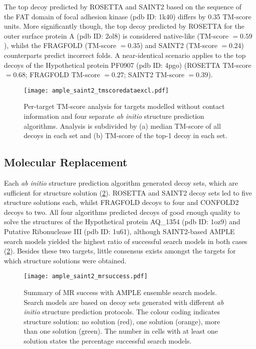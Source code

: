 The top decoy predicted by ROSETTA and SAINT2 based on the sequence of the FAT domain of focal adhesion kinase (\gls{pdb} ID: 1k40) differs by 0.35 TM-score units. More significantly though, the top decoy predicted by ROSETTA for the outer surface protein A (\gls{pdb} ID: 2ol8) is considered native-like (TM-score $=0.59$), whilst the FRAGFOLD (TM-score $=0.35$) and SAINT2 (TM-score $=0.24$) counterparts predict incorrect folds. A near-identical scenario applies to the top decoys of the Hypothetical protein PF0907 (\gls{pdb} ID: 4pgo) (ROSETTA TM-score $=0.68$; FRAGFOLD TM-score $=0.27$; SAINT2 TM-score $=0.39$).

\begin{figure}[H]
    \centering
    \texttt{[image: ample\_saint2\_tmscoredataexcl.pdf]}
    \caption[Per-target TM-score analysis for four modelling algorithms without contacts]{Per-target TM-score analysis for targets modelled without contact information and four separate \textit{ab initio} structure prediction algorithms. Analysis is subdivided by (a) median TM-score of all decoys in each set and (b) TM-score of the top-1 decoy in each set.}
    \label{fig:ample_saint2_tmscoredataexcl}
\end{figure}

\subsection{Molecular Replacement}

Each \textit{ab initio} structure prediction algorithm generated decoy sets, which are sufficient for structure solution (\cref{fig:ample_saint2_mrsuccess}). ROSETTA and SAINT2 decoy sets led to five structure solutions each, whilst FRAGFOLD decoys to four and CONFOLD2 decoys to two. All four algorithms predicted decoys of good enough quality to solve the structures of the Hypothetical protein AQ\_1354 (\gls{pdb} ID: 1oz9) and Putative Ribonuclease III (\gls{pdb} ID: 1u61), although SAINT2-based AMPLE search models yielded the highest ratio of successful search models in both cases (\cref{fig:ample_saint2_mrsuccess}). Besides these two targets, little consensus exists amongst the targets for which structure solutions were obtained.

\begin{figure}[H]
    \centering
    \texttt{[image: ample\_saint2\_mrsuccess.pdf]}
    \caption[Summary of MR success with AMPLE ensemble search models.]{Summary of MR success with AMPLE ensemble search models. Search models are based on decoy sets generated with different \textit{ab initio} structure prediction protocols. The colour coding indicates structure solution: no solution (red), one solution (orange), more than one solution (green). The number in cells with at least one solution states the percentage successful search models.}
    \label{fig:ample_saint2_mrsuccess}
\end{figure}
